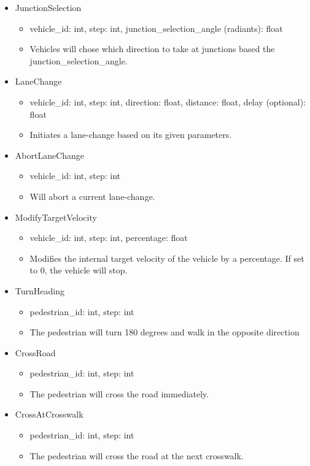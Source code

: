 \begin{itemize}
	\item JunctionSelection
	\begin{itemize}
		\item vehicle\_id: int, step: int, junction\_selection\_angle (radiants): float
		\item Vehicles will chose which direction to take at junctions based the junction\_selection\_angle.
	\end{itemize}
	\item LaneChange
	\begin{itemize}
		\item vehicle\_id: int, step: int, direction: float, distance: float, delay (optional): float
		\item Initiates a lane-change based on its given parameters.
	\end{itemize}
	\item AbortLaneChange
	\begin{itemize}
		\item vehicle\_id: int, step: int
		\item Will abort a current lane-change.
	\end{itemize}
	\item ModifyTargetVelocity
	\begin{itemize}
		\item vehicle\_id: int, step: int, percentage: float
		\item Modifies the internal target velocity of the vehicle by a percentage. If set to 0, the vehicle will stop.
	\end{itemize}
	\item TurnHeading
	\begin{itemize}
		\item pedestrian\_id: int, step: int
		\item The pedestrian will turn 180 degrees and walk in the opposite direction
	\end{itemize}
	\item CrossRoad
	\begin{itemize}
		\item pedestrian\_id: int, step: int
		\item The pedestrian will cross the road immediately.
	\end{itemize}
	\item CrossAtCrosswalk
	\begin{itemize}
		\item pedestrian\_id: int, step: int
		\item The pedestrian will cross the road at the next crosswalk.
	\end{itemize}
\end{itemize}

